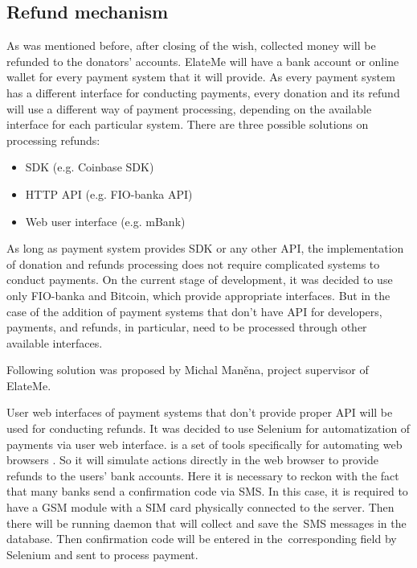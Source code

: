 \subsection{Refund mechanism}
As was mentioned before, after closing of the wish, collected money will be refunded to the donators' accounts. ElateMe
will have a bank account or online wallet for every payment system that it will provide. As every payment system has
a different interface for conducting payments, every donation and its refund will use a different way of payment
processing, depending on the available interface for each particular system. There are three possible solutions on
processing refunds:

\begin{itemize}\setlength\itemsep{.2em}
    \item \ac{SDK} (e.g. Coinbase \ac{SDK})
    \item \acs{HTTP} \ac{API} (e.g. FIO-banka \ac{API})
    \item Web user interface (e.g. mBank)
\end{itemize}

As long as payment system provides \ac{SDK} or any other \ac{API}, the implementation of donation and refunds processing
does not require complicated systems to conduct payments. On the current stage of development, it was decided to use
only FIO-banka and Bitcoin, which provide appropriate interfaces. But in the case of the addition of payment systems
that don't have \ac{API} for developers, payments, and refunds, in particular, need to be processed through other
available interfaces.

Following solution was proposed by Michal Maněna, project supervisor of ElateMe.

User web interfaces of payment systems that don't provide proper \ac{API} will be used for conducting refunds. It was
decided to use Selenium for automatization of payments via user web interface.  is a set of tools
specifically for automating web browsers \cite{selenium}. So it will simulate actions directly in the web browser
to provide refunds to the users' bank accounts. Here it is necessary to reckon with the fact that many banks send
a confirmation code via SMS. In this case, it is required to have a \ac{GSM} module with a SIM card physically connected
to the server. Then there will be running daemon that will collect and save the~SMS messages in the database. Then
confirmation code will be entered in the~corresponding field by Selenium and sent to process payment.


